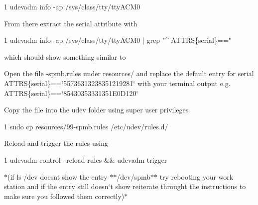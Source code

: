 \begin{DoxyCode}
1 udevadm info -ap /sys/class/tty/ttyACM0
\end{DoxyCode}



\begin{DoxyItemize}
\item From there extract the serial attribute with
\end{DoxyItemize}


\begin{DoxyCode}
1 udevadm info -ap /sys/class/tty/ttyACM0 | grep "^    ATTRS\{serial\}=="
\end{DoxyCode}


which should show something similar to





\begin{DoxyItemize}
\item Open the file {-\/spmb.\+rules} under {\ttfamily resources/} and replace the default entry for serial {\ttfamily A\+T\+T\+RS\{serial\}==\char`\"{}55736313238351219281\char`\"{}} with your terminal output e.\+g. {\ttfamily A\+T\+T\+RS\{serial\}==\char`\"{}85430353331351\+E0\+D120\char`\"{}}
\item Copy the file into the udev folder using super user privileges
\end{DoxyItemize}


\begin{DoxyCode}
1 sudo cp resources/99-spmb.rules /etc/udev/rules.d/
\end{DoxyCode}



\begin{DoxyItemize}
\item Reload and trigger the rules using
\end{DoxyItemize}


\begin{DoxyCode}
1 udevadm control --reload-rules && udevadm trigger
\end{DoxyCode}


$\ast$(if {\ttfamily ls /dev} doesn\textquotesingle{}t show the entry $\ast$$\ast$/dev/spmb$\ast$$\ast$ try rebooting your work station and if the entry still doesn`t show reiterate throught the instructions to make sure you followed them correctly)$\ast$ 